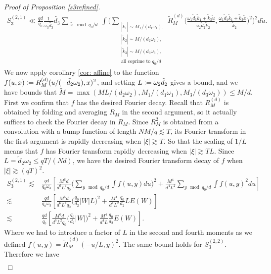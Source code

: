 \begin{proof}[Proof of Proposition \ref{s3refined}]
    \begin{align*}
        S_3^{(2,1)}\ll
        \frac{qd}{q_0} \frac{1}{\omega_3\tilde{d_3}}\tilde{d_3} \sum_{\substack{\tilde{x} \mod q_0/d} }\int\Bigg(\sum_{\substack{|\tilde{k}_1|\sim M_1/(d_1\omega_1),\\|\tilde{k}_2|\sim M/(d_2\omega_2),\\|\tilde{k}_3|\sim M/(d_3\omega_3),\\
        \textrm{all coprime to $q_0/d$}}}
        \tilde{R}_M^{(d)}\Big(\frac{\omega_1\tilde{d}_1\tilde{k}_1+\tilde{k}_3\tilde{u}}{-\omega_2\tilde{d}_2\tilde{k}_2},\frac{\omega_1\tilde{d}_1\tilde{k}_1+\tilde{k}_3 \tilde{x}}{-\tilde{k}_2}\Big)^2\Bigg)^2 d\tilde{u}.
    \end{align*}
    We now apply corollary \ref{cor: affine} to the function $f(u,x)\mathrel{\mathop:}= R_M^{(d)}(u/(-\tilde{d}_2\omega_2),x)^2$, and setting $L\mathrel{\mathop:}=\omega_2\tilde{d}_2$ gives a bound, and we have bounds that $\tilde{M} = \max(ML/(d_2\omega_2) ,M_1/(d_1\omega_1),M_3/(d_3\omega_3))\leq M/d $. First we confirm that $f$ has the desired Fourier decay.
    Recall that $R_M^{(d)}$ is obtained by folding and averaging $R_M$ in the second argument, so it actually suffices to check the Fourier decay in $R_M$.
    Since $R_M^2$ is obtained from a convolution with a bump function of length $NM/q\lesssim T$, its Fourier transform in the first argument is rapidly decreasing when
    $|\xi|\gtrsim T$. So that the scaling of $1/L$ means that $f$ has Fourier transform rapidly decreasing when $|\xi|\gtrsim TL$. Since $L=\tilde{d}_2\omega_2\leq qT/(Nd)$, we 
    have the desired Fourier transform decay of $f$ when $|\xi|\gtrsim (qT)^2$.
    \begin{align*}
        S_3^{(2,1)}\lesssim &  \frac{qd}{q_0\omega_3}\left[\frac{M^6d}{d^6L^4q_0}\Big(\sum_{y \mod q_0/d } \int f(u,y) du\Big)^2  + \frac{M^4}{d^4L^2}\sum_{y\mod q_0/d} \int f(u,y)^2 du
        \right]\\
        \lesssim& \frac{qd}{q_0\omega_3}\left[\frac{M^6d}{d^6L^4q_0}\Big(\frac{q_0}{d_2}|W|L)^2  + \frac{M^4}{d^4L^2}\frac{q_0}{d_2}LE(W)
        \right]\\
        \lesssim & \frac{qd}{q_0}\left[\frac{M^6d}{d^6L^2q_0}\Big(\frac{q_0}{d_2}|W|)^2  + \frac{M^4}{d^4L}\frac{q_0}{d_2}E(W)\right].
    \end{align*}
    Where we had to introduce a factor of $L$ in the second and fourth moments as we defined $f(u,y) = \tilde{R}_M^{(d)}(-u/L,y)^2$. 
    The same bound holds for $S^{(2,2)}_3$.
    Therefore we have \begin{align*}

\end{align*}
\end{proof}
